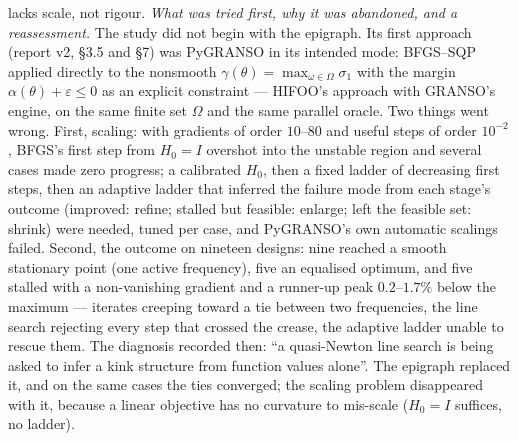 \documentclass[11pt,a4paper]{article}
\newcommand{\eps}{\varepsilon}
\newcommand{\revd}[1]{#1}
\begin{document}
lacks scale, not rigour.  \revd{\emph{What was tried first, why it was abandoned, and a reassessment.}  The
study did not begin with the epigraph.  Its first approach (report v2, \S3.5 and \S7)
was PyGRANSO in its intended mode: BFGS--SQP applied directly to the nonsmooth
$\gamma(\theta)=\max_{\omega\in\Omega}\sigma_1$ with the margin $\alpha(\theta)+\eps\le0$
as an explicit constraint --- HIFOO's approach with GRANSO's engine, on the same finite
set $\Omega$ and the same parallel oracle.  Two things went wrong.  First, scaling:
with gradients of order $10$--$80$ and useful steps of order $10^{-2}$, BFGS's first step
from $H_0=I$ overshot into the unstable region and several cases made zero progress; a
calibrated $H_0$, then a fixed ladder of decreasing first steps, then an adaptive ladder
that inferred the failure mode from each stage's outcome (improved: refine; stalled but
feasible: enlarge; left the feasible set: shrink) were needed, tuned per case, and
PyGRANSO's own automatic scalings failed.  Second, the outcome on nineteen designs: nine
reached a smooth stationary point (one active frequency), five an equalised optimum,
and five stalled with a non-vanishing gradient and a runner-up peak $0.2$--$1.7\%$
below the maximum --- iterates creeping toward a tie between two frequencies, the line
search rejecting every step that crossed the crease, the adaptive ladder unable to
rescue them.  The diagnosis recorded then: ``a quasi-Newton line search is being asked
to infer a kink structure from function values alone''.  The epigraph replaced it, and on
the same cases the ties converged; the scaling problem disappeared with it, because a
linear objective has no curvature to mis-scale ($H_0=I$ suffices, no ladder).

}
\end{document}
